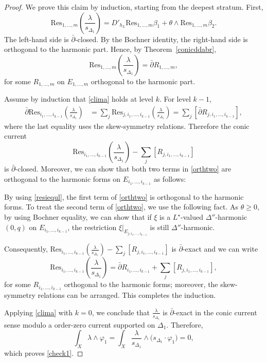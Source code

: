 \documentclass[english]{amsart}
\renewcommand{\geq}{\geqslant}
\newcommand{\Res}{\mathrm{Res}}
\newcommand{\dbar}{\bar \partial}
\numberwithin{equation}{thm}
\begin{document}
\begin{proof}
				\medskip
				
				We prove this claim by induction, starting from the deepest stratum. First,
				\[
				\Res_{1,\dots,m}\!\left(\frac{\lambda}{s_{\Delta_1}}\right)
				= D'_{h_L}\Res_{1,\dots,m}\beta_1
				+ \theta \wedge \Res_{1,\dots,m}\beta_2.
				\]
				The left-hand side is $\dbar$-closed. By the Bochner identity, the right-hand side is orthogonal to the harmonic part. Hence, by Theorem~\ref{conicddabr},
				\[
				\Res_{1,\dots,m}\!\left(\frac{\lambda}{s_{\Delta_1}}\right)=\dbar R_{1,\dots,m},
				\]
				for some $R_{1,\dots,m}$ on $E_{1,\dots,m}$ orthogonal to the harmonic part.
				
				Assume by induction that \eqref{clima} holds at level $k$. For level $k-1$,
				\begin{align*}
					\dbar \Res_{i_1,\dots,i_{k-1}}\!\left(\frac{\lambda}{s_{\Delta_1}}\right)
					&= \sum_j \Res_{j,i_1,\dots,i_{k-1}}\!\left(\frac{\lambda}{s_{\Delta_1}}\right)
					= \sum_j [\dbar R_{j,i_1,\dots,i_{k-1}}],
				\end{align*}
				where the last equality uses the skew-symmetry relations. Therefore the conic current
				\begin{equation}\label{orthtwo}
				\Res_{i_1,\dots,i_{k-1}}\!\left(\frac{\lambda}{s_{\Delta_1}}\right)
				- \sum_j [R_{j,i_1,\dots,i_{k-1}}]
				\end{equation}
				is $\dbar$-closed. Moreover, we can show that both two terms in \eqref{orthtwo} are orthogonal to the harmonic forms on $E_{i_1,\dots,i_{k-1}}$ as follows:
				
				 By using \eqref{resiequl}, the first term of \eqref{orthtwo} is orthogonal to the harmonic forms. To treat the second term of \eqref{orthtwo}, we use the following fact. As $\theta \geq 0$, by using Bochner equality, we can show that if $\xi$ is a $L^\star$-valued $\Delta''$-harmonic $(0,q)$ on $E_{i_1,\dots,i_{k-1}}$, the restriction $\xi |_{E_{j,i_1,\dots,i_{k-1}}}$ is still $\Delta''$-harmonic. 
				 
				 Consequently, $\Res_{i_1,\dots,i_{k-1}}\!\left(\frac{\lambda}{s_{\Delta_1}}\right)
				 - \sum_j [R_{j,i_1,\dots,i_{k-1}}]$ is $\dbar$-exact and we can write
				\[
				\Res_{i_1,\dots,i_{k-1}}\!\left(\frac{\lambda}{s_{\Delta_1}}\right)
				= \dbar R_{i_1,\dots,i_{k-1}} + \sum_j [R_{j,i_1,\dots,i_{k-1}}],
				\]
				for some $R_{i_1,\dots,i_{k-1}}$ orthogonal to the harmonic forms; moreover, the skew-symmetry relations can be arranged. This completes the induction.
				
				\medskip
				
				Applying \eqref{clima} with $k=0$, we conclude that $\frac{\lambda}{s_{\Delta_1}}$ is $\dbar$-exact in the conic current sense modulo a order-zero current supported on $\Delta_1$. Therefore,
				\[
				\int_X \lambda\wedge \varphi_1
				= \int_X \frac{\lambda}{s_{\Delta_1}} \wedge \bigl(s_{\Delta_1}\cdot \varphi_1\bigr)
				=0,
				\]
				which proves \eqref{check1}.
			\end{proof}
			
\end{document}
